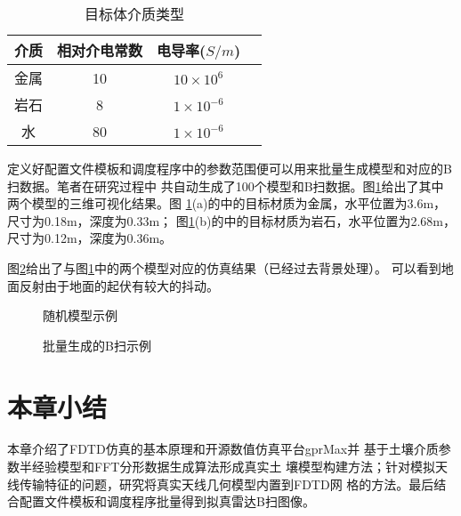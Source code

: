 \begin{table}[htbp]
	\caption{目标体介质类型} 
	\begin{tabular}{|c|c|c|c|} 
		\hline  
		介质 &  相对介电常数 & 电导率($S/m$)\\
		\hline 
		金属 & 10 & $10\times10^6$ \\  
		\hline  
		岩石 & 8 & $1\times10^{-6}$ \\  
		\hline  
		水 & 80 & $1\times10^{-6}$ \\  
		\hline  
	\end{tabular}
	\label{table_material}
\end{table}

定义好配置文件模板和调度程序中的参数范围便可以用来批量生成模型和对应的B扫数据。笔者在研究过程中
共自动生成了100个模型和B扫数据。图\ref{model_example}给出了其中两个模型的三维可视化结果。图
\ref{model_example}(a)的中的目标材质为金属，水平位置为3.6m，尺寸为0.18m，深度为0.33m；
图\ref{model_example}(b)的中的目标材质为岩石，水平位置为2.68m，尺寸为0.12m，深度为0.36m。

图\ref{bscan_example}给出了与图\ref{model_example}中的两个模型对应的仿真结果（已经过去背景处理）。
可以看到地面反射由于地面的起伏有较大的抖动。
\begin{figure}[htbp]
	\caption{随机模型示例}
	\label{model_example}
\end{figure}

\begin{figure}[htbp]
	\caption{批量生成的B扫示例}
	\label{bscan_example}
\end{figure}
\section{本章小结}
本章介绍了FDTD仿真的基本原理和开源数值仿真平台gprMax并
基于土壤介质参数半经验模型和FFT分形数据生成算法形成真实土
壤模型构建方法；针对模拟天线传输特征的问题，研究将真实天线几何模型内置到FDTD网
格的方法。最后结合配置文件模板和调度程序批量得到拟真雷达B扫图像。